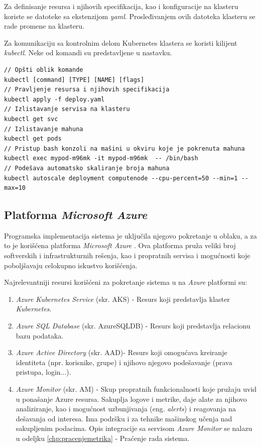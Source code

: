 \documentclass[12pt,oneside]{memoir}
\begin{document}
Za definisanje resursa i njihovih specifikacija, kao i konfiguracije na klasteru koriste se datoteke sa ekstenzijom \emph{yaml}. Prosleđivanjem ovih datoteka klasteru se rade promene na klasteru.

Za komunikaciju sa kontrolnim delom Kubernetes klastera se koristi kilijent \emph{kubectl}. Neke od komandi su predstavljene u nastavku.

\begin{verbatim}
// Opšti oblik komande
kubectl [command] [TYPE] [NAME] [flags]
// Pravljenje resursa i njihovih specifikacija
kubectl apply -f deploy.yaml
// Izlistavanje servisa na klasteru
kubectl get svc
// Izlistavanje mahuna
kubectl get pods
// Pristup bash konzoli na mašini u okviru koje je pokrenuta mahuna
kubectl exec mypod-m96mk -it mypod-m96mk  -- /bin/bash
// Podešava automatsko skaliranje broja mahuna
kubectl autoscale deployment computenode --cpu-percent=50 --min=1 --max=10
\end{verbatim}

\subsection{Platforma \emph{Microsoft Azure}}
\label{sub:azureplatform}

Programska implementacija sistema je uključila njegovo pokretanje u oblaku, a za to je korišćena platforma \emph{Microsoft Azure} \cite{Azure}. Ova platforma pruža veliki broj softverskih i infrastrukturnih rešenja, kao i propratnih servisa i mogućnosti koje poboljšavaju celokupno iskustvo korišćenja.

Najrelevantniji resursi korišćeni za pokretanje sistema u na \emph{Azure} platformi su:
\begin{enumerate}
\item \emph{Azure Kubernetes Service} (skr. AKS) \cite{AKS} - Resurs koji predstavlja klaster \emph{Kubernetes}.
\item \emph{Azure SQL Database} (skr. AzureSQLDB) \cite{AzureSQLDB} - Resurs koji predstavlja relacionu bazu podataka.
\item \emph{Azure Active Directory} \cite{AAD}  (skr. AAD)- Resurs koji omogućava kreiranje identiteta (npr. korisnike, grupe) i njihovo njegovo podešavanje (prava pristupa, login...).
\item \emph{Azure Monitor} (skr. AM) \cite{AzureMonitor} - Skup propratnih funkcionalnosti koje pružaju uvid u ponašanje Azure resursa. Sakuplja logove i metrike, daje alate za njihovo analiziranje, kao i mogućnost uzbunjivanja (eng. \emph{alerts}) i reagovanja na dešavanja od interesa. Ima podršku i za tehnike mašinskog učenja nad sakupljenim podacima. Opis integracije sa servisom \emph{Azure Monitor} se nalazu u odeljku \ref{chp:pracenjemetrika} - Praćenje rada sistema.
\end{enumerate}
\end{document}
